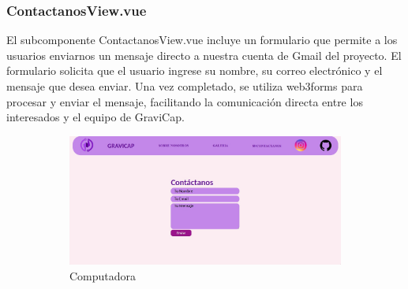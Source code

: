                 \subsubsection{ContactanosView.vue}
                    El subcomponente ContactanosView.vue incluye un formulario que permite a los usuarios enviarnos un mensaje directo a nuestra cuenta de Gmail del proyecto. El formulario solicita que el usuario ingrese su nombre, su correo electrónico y el mensaje que desea enviar. Una vez completado, se utiliza web3forms para procesar y enviar el mensaje, facilitando la comunicación directa entre los interesados y el equipo de \textcolor{dark_violet}{GraviCap}.\par

                    \begin{figure} [H]
                    \centering
                    \begin{subfigure}{0.5\textwidth}
                        \centering
                        \includegraphics[width=\textwidth]{Imagenes/Página Web/Computadora/Contactos.jpg}
                        \caption{Computadora}
                        \label{fig:pw5.1}
                    \end{subfigure}
                    \begin{subfigure}{0.4\textwidth}
                        \centering

\end{subfigure}
\end{figure}
